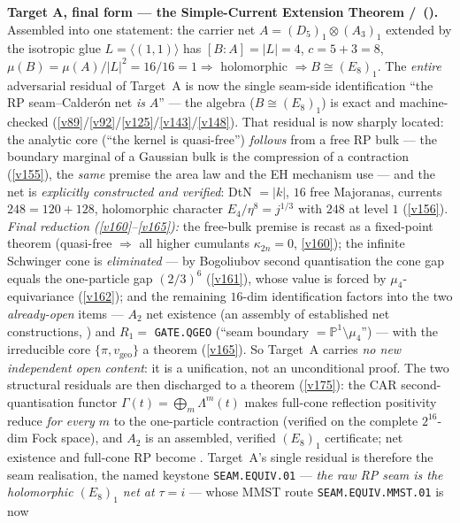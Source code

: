 \begin{winbox}
\smallskip\noindent\textbf{Target A, final form --- the Simple-Current Extension Theorem \mE/\mC\
().} Assembled into one statement: the carrier net
$A=(D_5)_1{\otimes}(A_3)_1$ extended by the isotropic glue $L=\langle(1,1)\rangle$ has $[B:A]{=}|L|{=}4$,
$c{=}5{+}3{=}8$, $\mu(B){=}\mu(A)/|L|^2{=}16/16{=}1\Rightarrow$ holomorphic $\Rightarrow B\cong(E_8)_1$. The
\emph{entire} adversarial residual of Target~A is now the single seam-side identification ``the RP
seam--Calder\'on net \emph{is} $A$'' --- the algebra ($B\cong(E_8)_1$) is exact and machine-checked
(\vref{v89}/\vref{v92}/\vref{v125}/\vref{v143}/\vref{v148}). That residual is now sharply located: the
analytic core (``the kernel is quasi-free'') \emph{follows} from a free RP bulk --- the boundary marginal of
a Gaussian bulk is the compression of a contraction (\vref{v155}), the \emph{same} premise the area law and
the EH mechanism use --- and the net is \emph{explicitly constructed and verified}: DtN $=|k|$, $16$ free
Majoranas, currents $248{=}120{+}128$, holomorphic character $E_4/\eta^8=j^{1/3}$ with $248$ at level $1$
(\vref{v156}). \emph{Final reduction (\vref{v160}--\vref{v165}):} the free-bulk premise is recast as a
fixed-point theorem (quasi-free $\Rightarrow$ all higher cumulants $\kappa_{2n}{=}0$, \vref{v160}); the
infinite Schwinger cone is \emph{eliminated} --- by Bogoliubov second quantisation the cone gap equals the
one-particle gap $(2/3)^6$ (\vref{v161}), whose value is forced by $\mu_4$-equivariance (\vref{v162}); and
the remaining $16$-dim identification factors into the two \emph{already-open} items --- $A_2$ net existence
(an assembly of established net constructions, \mC) and $R_1=$ \texttt{GATE.QGEO} (``seam boundary $=
\mathbb P^1{\setminus}\mu_4$'') --- with the irreducible core $\{\pi,v_{\mathrm{geo}}\}$ a theorem
(\vref{v165}). So Target~A carries \emph{no new independent open content}: it is a unification, not an
unconditional proof. The two structural residuals are then discharged to a theorem (\vref{v175}): the CAR
second-quantisation functor $\Gamma(t){=}\bigoplus_m\Lambda^m(t)$ makes full-cone reflection positivity
reduce \emph{for every $m$} to the one-particle contraction (verified on the complete $2^{16}$-dim Fock
space), and $A_2$ is an assembled, verified $(E_8)_1$ certificate; net existence and full-cone RP become
\mE. Target~A's single residual is therefore the seam realisation, the named keystone
\texttt{SEAM.EQUIV.01} --- \emph{the raw RP seam is the holomorphic $(E_8)_1$ net at $\tau{=}i$} --- whose MMST route
\texttt{SEAM.EQUIV.MMST.01} is now

\end{winbox}
